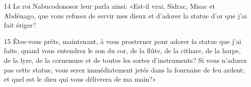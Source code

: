 14 Le roi Nabucodonosor leur parla ainsi: «Est-il vrai, Sidrac, Misac et Abdénago, que vous refusez de servir mes dieux et d’adorer la statue d’or que j’ai fait ériger?

15 Êtes-vous prêts, maintenant, à vous prosterner pour adorer la statue que j’ai faite, quand vous entendrez le son du cor, de la flûte, de la cithare, de la harpe, de la lyre, de la cornemuse et de toutes les sortes d’instruments? Si vous n’adorez pas cette statue, vous serez immédiatement jetés dans la fournaise de feu ardent; et quel est le dieu qui vous délivrera de ma main?»

